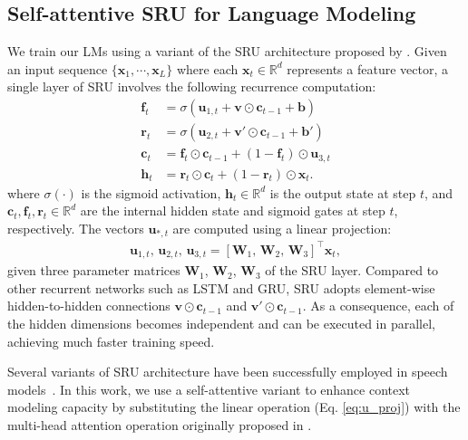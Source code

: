 \documentclass[a4paper]{article}
\begin{document}
\subsection{Self-attentive SRU for Language Modeling}
We train our LMs using a variant of the SRU architecture proposed by \cite{lei18}. 
Given an input sequence $\{\mathbf{x}_1, \cdots, \mathbf{x}_L\}$ where each $\mathbf{x}_t \in \mathbb{R}^d$ represents a feature vector, a single layer of SRU involves the following recurrence computation:
\begin{align*}
    \mathbf{f}_t &= \sigma(\mathbf{u}_{1,t} + \mathbf{v}\odot \mathbf{c}_{t-1} + \mathbf{b}) \\
    \mathbf{r}_t &= \sigma(\mathbf{u}_{2,t} + \mathbf{v}'\odot \mathbf{c}_{t-1} + \mathbf{b}') \\
    \mathbf{c}_t &= \mathbf{f}_t\odot \mathbf{c}_{t-1} + (1-\mathbf{f}_t)\odot \mathbf{u}_{3,t} \\
    \mathbf{h}_t &= \mathbf{r}_t\odot \mathbf{c}_t + (1-\mathbf{r}_t) \odot \mathbf{x}_t .
\end{align*}
where $\sigma( \cdot )$ is the sigmoid activation, $\mathbf{h}_t \in \mathbb{R}^d$ is the output state at step $t$, and $\mathbf{c}_t, \mathbf{f}_t, \mathbf{r}_t\in \mathbb{R}^d$ are the internal hidden state and sigmoid gates at step $t$, respectively.
The vectors $\mathbf{u}_{*,t}$ are computed using a linear projection:
\begin{align}
\mathbf{u}_{1,t},\, \mathbf{u}_{2,t},\, \mathbf{u}_{3,t} = \left[\mathbf{W}_1,\, \mathbf{W}_2,\, \mathbf{W}_3\right]^\top \mathbf{x}_t,
\label{eq:u_proj}
\end{align}
given three parameter matrices $\mathbf{W}_1$, $\mathbf{W}_2$, $\mathbf{W}_3$ of the SRU layer. 
Compared to other recurrent networks such as LSTM and GRU, SRU adopts element-wise hidden-to-hidden connections $\mathbf{v}\odot \mathbf{c}_{t-1}$ and $\mathbf{v}'\odot \mathbf{c}_{t-1}$.
As a consequence, each of the hidden dimensions becomes independent and can be executed in parallel, achieving much faster training speed.

Several variants of SRU architecture have been successfully employed in speech models~\cite{park2018fully,shangguan2019optimizing,Koriyama_2020}.
In this work, we use a self-attentive variant to enhance context modeling capacity by substituting the linear operation (Eq. \ref{eq:u_proj}) with the multi-head attention operation originally proposed in \cite{vaswani}.
\end{document}

